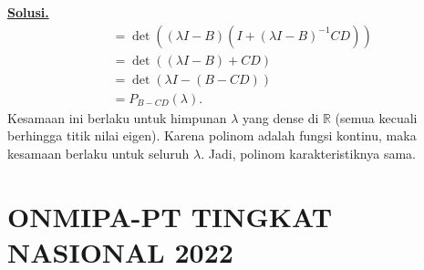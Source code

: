 \documentclass[12pt,twoside]{article}
\newenvironment{solution}
{
	\par\noindent\textbf{\underline{Solusi.}}\\
}
{
	\par
}
\begin{document}
\begin{enumerate}
\begin{solution}
\[\begin{aligned}
                                & = \det( (\lambda I - B) (I + (\lambda I - B)^{-1} C D) ) \\
                                & = \det( (\lambda I - B) + C D )                          \\
                                & = \det( \lambda I - (B - CD) )                           \\
                                & = P_{B-CD}(\lambda).
            \end{aligned} \]
          Kesamaan ini berlaku untuk himpunan $\lambda$ yang dense di $\mathbb{R}$ (semua kecuali berhingga titik nilai eigen). Karena polinom adalah fungsi kontinu, maka kesamaan berlaku untuk seluruh $\lambda$.
          Jadi, polinom karakteristiknya sama.
        \end{solution}
\end{enumerate}

\pagebreak

\section{ONMIPA-PT TINGKAT NASIONAL 2022}
\end{document}
